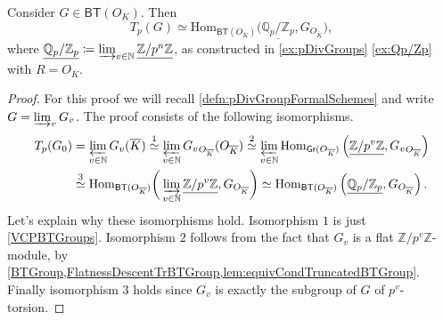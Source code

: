 \begin{prop}[]\label{AlternativeDefnTateModule}
	Consider $G \in \mathsf{BT}(O_K)$.
	Then
	\begin{equation*}
		T_p(G) \simeq \mathrm{Hom}_{ \mathsf{BT}(O_{\overline{K}}) }
		\big( \underline{\mathbb{Q}_p/\mathbb{Z}_{p}}, G_{O_{\overline{K}}} \big)
	,\end{equation*}
	where $\underline{\mathbb{Q}_p/\mathbb{Z}_{p}} \coloneqq \varinjlim_{v \in \mathbb{N}}
	\underline{\mathbb{Z}/p^n\mathbb{Z}}$, as constructed 
	in \cref{ex:pDivGroups} \cref{ex:Qp/Zp} with $R = O_{\overline{K}}$.
\end{prop}
\begin{proof}
	For this proof we will recall \cref{defn:pDivGroupFormalSchemes}
	and write $G = \varinjlim_v G_v$.
	The proof consists of the following isomorphisms.
	\begin{align*}
		T_p(G_0) &= \varprojlim_{v \in \mathbb{N}} G_v(\overline{K})
		\stackrel{1}{\simeq} \varprojlim_{v \in \mathbb{N}} {G_v}_{O_{\overline{K}}}(O_{\overline{K}})
		\stackrel{2}{\simeq} \varprojlim_{v \in \mathbb{N}}
		\mathrm{Hom}_{ \mathsf{Gr}(O_{\overline{K}}) }
		\left( \underline{\mathbb{Z}/p^v\mathbb{Z}}, {G_v}_{O_{\overline{K}}} \right) \\
		&\stackrel{3}{\simeq} 
		\mathrm{Hom}_{ \mathsf{BT}(O_{\overline{K}}) } 
		\bigg( \varinjlim_{v \in \mathbb{N}} \underline{\mathbb{Z}/p^v\mathbb{Z}}, G_{O_{\overline{K}}} \bigg) 
		\simeq \mathrm{Hom}_{ \mathsf{BT}(O_{\overline{K}}) } 
		\left( \underline{\mathbb{Q}_p/\mathbb{Z}_{p}}, G_{O_{\overline{K}}} \right)
	.\end{align*}
	Let's explain why these isomorphisms hold.
	Isomorphism $1$ is just \cref{VCPBTGroups}.
	Isomorphism $2$ follows from the fact that $G_v$ is
	a flat $\mathbb{Z}/p^v\mathbb{Z}$-module, by 
	\cref{BTGroup,FlatnessDescentTrBTGroup,lem:equivCondTruncatedBTGroup}.
	Finally isomorphism $3$ holds since $G_v$ is exactly the
	subgroup of $G$ of $p^v$-torsion.
\end{proof}


